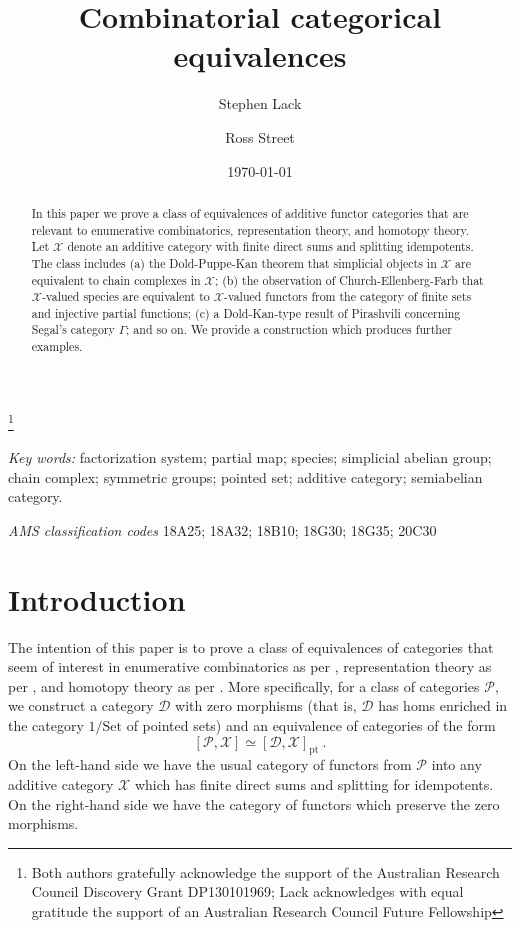 \documentclass[a4paper,12pt,reqno]{amsart}
\theoremstyle{definition}
\theoremstyle{fact}
\theoremstyle{genquest}
\theoremstyle{step}
\def\CD{{\mathscr D}}
\def\CP{{\mathscr P}}
\def\CX{{\mathscr X}}
\begin{document}
\title{Combinatorial categorical equivalences}

\author{Stephen Lack}
\address{Department of Mathematics, Macquarie University, NSW 2109, Australia}

\author{Ross Street}
\address{Department of Mathematics, Macquarie University, NSW 2109, Australia}

\thanks{Both authors gratefully acknowledge the support of the Australian Research Council Discovery Grant DP130101969; Lack acknowledges with equal gratitude the support of an Australian Research Council Future Fellowship}

\date{\today}
\maketitle
\begin{abstract}
In this paper we prove a class of equivalences of additive functor categories that are relevant to enumerative combinatorics, representation theory, and homotopy theory.
Let $\CX$ denote an additive category with finite direct sums and splitting idempotents.
The class includes 
(a) the Dold-Puppe-Kan theorem that simplicial objects in $\CX$ are
equivalent to chain complexes in $\CX$; 
(b) the observation of Church-Ellenberg-Farb that $\CX$-valued species are equivalent to $\CX$-valued functors from the category of finite sets and injective partial functions; 
(c) a Dold-Kan-type result of Pirashvili concerning Segal's category $\Gamma$; and so on. 
We provide a construction which produces further examples.
\end{abstract}

\noindent \small{{\em Key words:} factorization system; partial map; species; simplicial abelian group; chain complex; symmetric groups; pointed set; additive category; semiabelian category.}
\bigskip

\noindent \small{{\em AMS classification codes} 18A25; 18A32; 18B10; 18G30; 18G35; 20C30}

\tableofcontents

\section{Introduction}

The intention of this paper is to prove a class of equivalences of categories that 
seem of interest in enumerative combinatorics as per \cite{Species},
representation theory as per \cite{CEF2012}, 
and homotopy theory as per \cite{Berger1996}.
More specifically, for a class of categories $\CP$, we construct a category $\CD$
with zero morphisms (that is, $\CD$ has homs enriched in the category
$1/\mathrm{Set}$ of pointed sets) and an equivalence of categories of the form
\begin{equation}\label{basicequ}
[\CP,\CX] \simeq [\CD,\CX]_{\mathrm{pt}} \ .
\end{equation}
On the left-hand side we have the usual category of functors from
$\CP$ into any additive category $\CX$ which has finite direct sums
and splitting for idempotents. 
On the right-hand side we have the category of functors which preserve
the zero morphisms.
\end{document}
